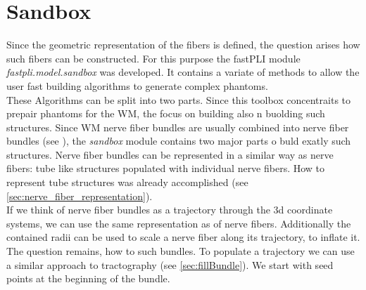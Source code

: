 \section{Sandbox}
% 
Since the geometric representation of the fibers is defined, the question arises how such fibers can be constructed.
For this purpose the \ac{fastPLI} module \textit{fastpli.model.sandbox} was developed.
It contains a variate of methods to allow the user fast building algorithms to generate complex phantoms.
\\
% 
These Algorithms can be split into two parts.
Since this toolbox concentraits to prepair phantoms for the \ac{WM}, the focus on building also n buolding such structures.
Since \ac{WM} nerve fiber bundles are usually combined into nerve fiber bundles (see \dummy), the \textit{sandbox} module contains two major parts o buld exatly such structures.
%
Nerve fiber bundles can be represented in a similar way as nerve fibers: tube like structures populated with individual nerve fibers.
How to represent tube structures was already accomplished (see \cref{sec:nerve_fiber_representation}).
\\
If we think of nerve fiber bundles as a trajectory through the 3d coordinate systems, we can use the same representation as of nerve fibers.
Additionally the contained radii can be used to scale a nerve fiber along its trajectory, \ie to inflate it.
\\
% 
The question remains, how to  such bundles.
To populate a trajectory we can use a similar approach to tractography (see \cref{sec:fillBundle}).
We start with seed points at the beginning of the bundle.
% 
